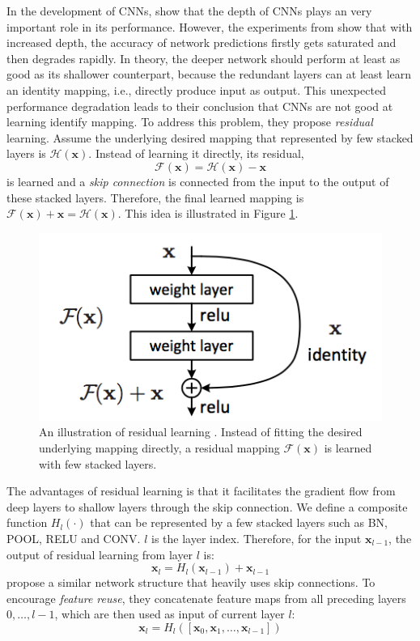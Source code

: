 In the development of CNNs, \citet{Simonyan14c} show that the depth of CNNs plays an very important role in its performance. However, the experiments from \citet{he2016deep} show that with increased depth, the accuracy of network predictions firstly gets saturated and then degrades rapidly. In theory, the deeper network should perform at least as good as its shallower counterpart, because the redundant layers can at least learn an identity mapping, i.e., directly produce input as output. This unexpected performance degradation leads to their conclusion that CNNs are not good at learning identify mapping. To address this problem, they propose \textit{residual} learning. Assume the underlying desired mapping that represented by few stacked layers is $\mathcal{H}(\mathbf{x})$. Instead of learning it directly, its residual,
\[\mathcal{F}(\mathbf{x}) = \mathcal{H}(\mathbf{x}) - \mathbf{x}\]
is learned and a \textit{skip connection} is connected from the input to the output of these stacked layers. Therefore, the final learned mapping is $\mathcal{F}(\mathbf{x}) + \mathbf{x} = \mathcal{H}(\mathbf{x})$. This idea is illustrated in Figure \ref{fig:res_idea}. 
\begin{figure}[ht]
  \centering
    \includegraphics[width=.55\textwidth]{figures/res_idea.png}
    \caption[An illustration of residual learning]{An illustration of residual learning \citep{he2016deep}. Instead of fitting the desired underlying mapping directly, a residual mapping $\mathcal{F}(\mathbf{x})$ is learned with few stacked layers.}
    \label{fig:res_idea}
\end{figure}

The advantages of residual learning is that it facilitates the gradient flow from deep layers to shallow layers through the skip connection. We define a composite function $H_l(\cdot)$ that can be represented by a few stacked layers such as BN, POOL, RELU and CONV. $l$ is the layer index. Therefore, for the input $\mathbf{x}_{l-1}$, the output of residual learning from layer $l$ is:
\begin{equation}
\mathbf{x}_{l} = H_l(\mathbf{x}_{l-1}) + \mathbf{x}_{l-1}
\end{equation}
\citet{huang2016densely} propose a similar network structure that heavily uses skip connections. To encourage \textit{feature reuse}, they concatenate feature maps from all preceding layers $0, \ldots, l-1$, which are then used as input of current layer $l$:
\begin{equation}
\mathbf{x}_{l} = H_l([\mathbf{x}_{0}, \mathbf{x}_{1}, \ldots, \mathbf{x}_{l-1}]) 
\end{equation}

